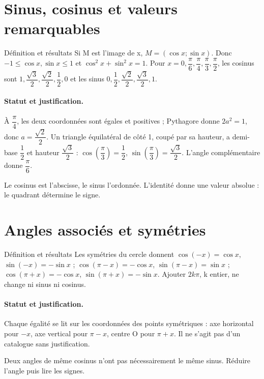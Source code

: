 \section{Sinus, cosinus et valeurs remarquables}\label{C10-U3}
\begin{repere}{Définition et résultats}
Si M est l’image de x, $M=(\cos x;\sin x)$. Donc $-1\leq\cos x,\sin x\leq1$ et $\cos^2x+\sin^2x=1$. Pour $x=0,\dfrac{\pi}{6},\dfrac{\pi}{4},\dfrac{\pi}{3},\dfrac{\pi}{2}$, les cosinus sont $1,\dfrac{\sqrt 3}{2},\dfrac{\sqrt 2}{2},\dfrac{1}{2},0$ et les sinus $0,\dfrac{1}{2},\dfrac{\sqrt 2}{2},\dfrac{\sqrt 3}{2},1$.
\end{repere}
\paragraph{Statut et justification.} À $\dfrac{\pi}{4}$, les deux coordonnées sont égales et positives ; Pythagore donne $2a^2=1$, donc $a=\dfrac{\sqrt 2}{2}$. Un triangle équilatéral de côté 1, coupé par sa hauteur, a demi-base $\dfrac{1}{2}$ et hauteur $\dfrac{\sqrt 3}{2}$ : $\cos (\dfrac{\pi}{3})=\dfrac{1}{2}$, $\sin (\dfrac{\pi}{3})=\dfrac{\sqrt 3}{2}$. L’angle complémentaire donne $\dfrac{\pi}{6}$.
\label{C10-EX3}

\begin{erreur}Le cosinus est l’abscisse, le sinus l’ordonnée. L’identité donne une valeur absolue : le quadrant détermine le signe.\end{erreur}
\label{C10-AP3}
\section{Angles associés et symétries}\label{C10-U4}
\begin{repere}{Définition et résultats}
Les symétries du cercle donnent $\cos(-x)=\cos x$, $\sin(-x)=-\sin x$ ; $\cos(\pi-x)=-\cos x$, $\sin(\pi-x)=\sin x$ ; $\cos(\pi+x)=-\cos x$, $\sin(\pi+x)=-\sin x$. Ajouter $2k\pi$, k entier, ne change ni sinus ni cosinus.
\end{repere}
\paragraph{Statut et justification.} Chaque égalité se lit sur les coordonnées des points symétriques : axe horizontal pour $-x$, axe vertical pour $\pi-x$, centre O pour $\pi+x$. Il ne s’agit pas d’un catalogue sans justification.
\label{C10-EX4}
\begin{erreur}Deux angles de même cosinus n’ont pas nécessairement le même sinus. Réduire l’angle puis lire les signes.\end{erreur}
\label{C10-AP4}
